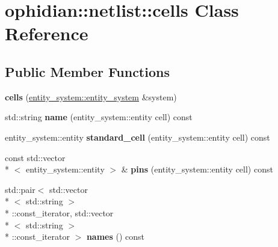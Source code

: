 \hypertarget{classophidian_1_1netlist_1_1cells}{\section{ophidian\-:\-:netlist\-:\-:cells Class Reference}
\label{classophidian_1_1netlist_1_1cells}
}
\subsection*{Public Member Functions}
\begin{DoxyCompactItemize}
\item 
\hypertarget{classophidian_1_1netlist_1_1cells_ab0d3a63e79b7a776cf76c2931978794c}{{\bfseries cells} (\hyperlink{classophidian_1_1entity__system_1_1entity__system}{entity\-\_\-system\-::entity\-\_\-system} \&system)}\label{classophidian_1_1netlist_1_1cells_ab0d3a63e79b7a776cf76c2931978794c}

\item 
\hypertarget{classophidian_1_1netlist_1_1cells_a404ca2ef043deb39289421101b2400ef}{std\-::string {\bfseries name} (entity\-\_\-system\-::entity cell) const }\label{classophidian_1_1netlist_1_1cells_a404ca2ef043deb39289421101b2400ef}

\item 
\hypertarget{classophidian_1_1netlist_1_1cells_aa6d99f51dcd50445c5e8f0b52aaf147f}{entity\-\_\-system\-::entity {\bfseries standard\-\_\-cell} (entity\-\_\-system\-::entity cell) const }\label{classophidian_1_1netlist_1_1cells_aa6d99f51dcd50445c5e8f0b52aaf147f}

\item 
\hypertarget{classophidian_1_1netlist_1_1cells_a6a20a7961fde746a7dbd49cc229f55a3}{const std\-::vector\\*
$<$ entity\-\_\-system\-::entity $>$ \& {\bfseries pins} (entity\-\_\-system\-::entity cell) const }\label{classophidian_1_1netlist_1_1cells_a6a20a7961fde746a7dbd49cc229f55a3}

\item 
\hypertarget{classophidian_1_1netlist_1_1cells_a208e79802cea975c583ca4d17abae3f1}{std\-::pair$<$ std\-::vector\\*
$<$ std\-::string $>$\\*
\-::const\-\_\-iterator, std\-::vector\\*
$<$ std\-::string $>$\\*
\-::const\-\_\-iterator $>$ {\bfseries names} () const }\label{classophidian_1_1netlist_1_1cells_a208e79802cea975c583ca4d17abae3f1}


\end{DoxyCompactItemize}
